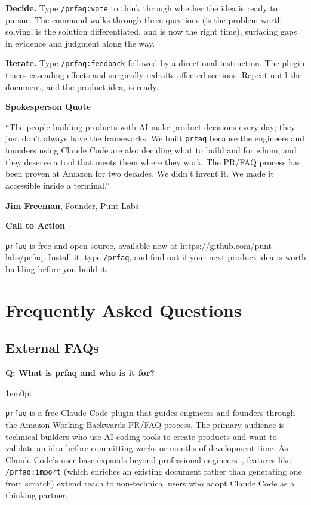 \documentclass[11pt,letterpaper]{article}
\newcommand{\prsection}[1]{%
  \vspace{1em}%
  {\large\bfseries\color{SectionBlue}#1}%
  \vspace{0.3em}\par%
}
\newcounter{faqnum}
\newenvironment{faqpair}[1]{%
  \needspace{4\baselineskip}%
  \vspace{0.5em}%
  \refstepcounter{faqnum}%
  \noindent\textbf{\color{SectionBlue}Q\thefaqnum: #1}\par\nopagebreak[4]%
  \vspace{0.2em}%
  \begin{adjustwidth}{1em}{0pt}%
  \setlength{\parindent}{0pt}%
}{%
  \end{adjustwidth}%
  \vspace{0.5em}%
}
\begin{document}
\textbf{Decide.} Type \texttt{/prfaq:vote} to think through whether the idea is ready to pursue. The command walks through three questions (is the problem worth solving, is the solution differentiated, and is now the right time), surfacing gaps in evidence and judgment along the way.

\textbf{Iterate.} Type \texttt{/prfaq:feedback} followed by a directional instruction. The plugin traces cascading effects and surgically redrafts affected sections. Repeat until the document, and the product idea, is ready.

\prsection{Spokesperson Quote}

\begin{spokespersonquote}
``The people building products with AI make product decisions every day; they just don't always have the frameworks. We built \texttt{prfaq} because the engineers and founders using Claude Code are also deciding what to build and for whom, and they deserve a tool that meets them where they work. The PR/FAQ process has been proven at Amazon for two decades. We didn't invent it. We made it accessible inside a terminal.''

\raggedleft \textbf{Jim Freeman}, Founder, Punt Labs
\end{spokespersonquote}

\prsection{Call to Action}

\texttt{prfaq} is free and open source, available now at \url{https://github.com/punt-labs/prfaq}. Install it, type \texttt{/prfaq}, and find out if your next product idea is worth building before you build it.

\newpage


\section*{Frequently Asked Questions}


\subsection*{External FAQs}

\begin{faqpair}{What is prfaq and who is it for?}
  \texttt{prfaq} is a free Claude Code plugin that guides engineers and founders through the Amazon Working Backwards PR/FAQ process. The primary audience is technical builders who use AI coding tools to create products and want to validate an idea before committing weeks or months of development time. As Claude Code's user base expands beyond professional engineers~\cite{nyt2026claudecode}, features like \texttt{/prfaq:import} (which enriches an existing document rather than generating one from scratch) extend reach to non-technical users who adopt Claude Code as a thinking partner.
\end{faqpair}
\end{document}
